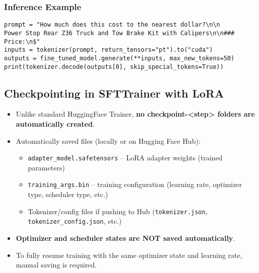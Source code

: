 \subsubsection{Inference Example}
\begin{tcolorbox}[colback=green!5!white, colframe=green!75!black, title=Inference Example]
\begin{verbatim}
prompt = "How much does this cost to the nearest dollar?\n\n
Power Stop Rear Z36 Truck and Tow Brake Kit with Calipers\n\n### Price:\n$"
inputs = tokenizer(prompt, return_tensors="pt").to("cuda")
outputs = fine_tuned_model.generate(**inputs, max_new_tokens=50)
print(tokenizer.decode(outputs[0], skip_special_tokens=True))
\end{verbatim}
\end{tcolorbox}



\subsection{Checkpointing in SFTTrainer with LoRA}

\begin{tcolorbox}[colback=green!5!white, colframe=green!75!black, title=What Actually Happens During Training]
\begin{itemize}
    \item Unlike standard HuggingFace Trainer, \textbf{no checkpoint-<step> folders are automatically created}.
    \item Automatically saved files (locally or on Hugging Face Hub):
    \begin{itemize}
        \item \texttt{adapter\_model.safetensors} -- LoRA adapter weights (trained parameters)
        \item \texttt{training\_args.bin} -- training configuration (learning rate, optimizer type, scheduler type, etc.)
        \item Tokenizer/config files if pushing to Hub (\texttt{tokenizer.json}, \texttt{tokenizer\_config.json}, etc.)
    \end{itemize}
    \item \textbf{Optimizer and scheduler states are NOT saved automatically}. 
    \item To fully resume training with the same optimizer state and learning rate, manual saving is required.
\end{itemize}
\end{tcolorbox}

